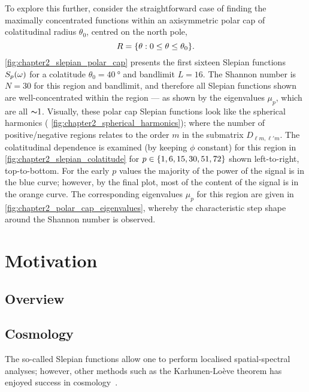 To explore this further, consider the straightforward case of finding the maximally concentrated functions within an axisymmetric polar cap of colatitudinal radius \(\theta_{0}\), centred on the north pole, \ie{}
%
\begin{equation}
	R
	= \{\theta: 0 \leq \theta \leq \theta_{0}\}.
\end{equation}
%
\cref{fig:chapter2_slepian_polar_cap} presents the first sixteen Slepian functions \({S}_{p}(\omega)\) for a colatitude \(\theta_{0}=\SI{40}{\degree}\) and bandlimit \(L=16\).
The Shannon number is \(N=30\) for this region and bandlimit, and therefore all Slepian functions shown are well-concentrated within the region --- as shown by the eigenvalues \(\mu_{p}\), which are all \({\thicksim}1\).
Visually, these polar cap Slepian functions look like the spherical harmonics (\cf{} \cref{fig:chapter2_spherical_harmonics}); where the number of positive/negative regions relates to the order \(m\) in the submatrix \(D_{\ell m,\ell'm}\).
The colatitudinal dependence is examined (by keeping \(\phi{}\) constant) for this region in \cref{fig:chapter2_slepian_colatitude} for \(p \in \{1,6,15,30,51,72\}\) shown left-to-right, top-to-bottom.
For the early \(p\) values the majority of the power of the signal is in the blue curve; however, by the final plot, most of the content of the signal is in the orange curve.
The corresponding eigenvalues \(\mu_{p}\) for this region are given in \cref{fig:chapter2_polar_cap_eigenvalues}, whereby the characteristic step shape around the Shannon number is observed.







\section{Motivation}\label{sec:chapter2_motivation}

\subsection{Overview}

\subsection{Cosmology}

The so-called Slepian functions allow one to perform localised spatial-spectral analyses; however, other methods such as the Karhunen-Loève theorem has enjoyed success in cosmology~\cite{Tegmark1997,Bond1994,Bunn1995}.

